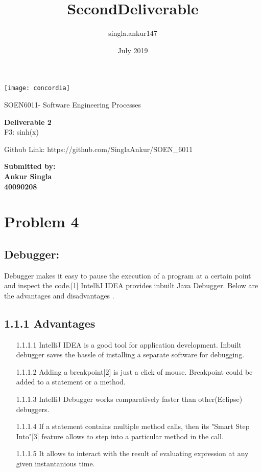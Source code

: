 \documentclass[10pt]{article}
\title{SecondDeliverable}
\author{singla.ankur147 }
\date{July 2019}
\begin{document}
\texttt{[image: concordia]}

\Large SOEN6011- Software Engineering Processes\\
\begin{center}
\textbf{Deliverable 2}\\
F3: sinh(x)
\end{center}

Github Link: https://github.com/SinglaAnkur/SOEN\_6011
\vspace{90mm}\\
\begin{large}
\textbf{Submitted by:}\\
\textbf{Ankur Singla}\\
\textbf{40090208}\\
\end{large}
\newpage
\tableofcontents
\newpage
\section{Problem 4}
\subsection{Debugger:}
Debugger makes it easy to pause the execution of a program at a certain point and inspect the code.[1] IntelliJ IDEA provides inbuilt Java Debugger. Below are the advantages and disadvantages .\\
\subsection*{\large 1.1.1 Advantages}
\begin{description}
\begin{itemize}
\item [1.1.1.1] IntelliJ IDEA is a good tool for application development. Inbuilt debugger saves the hassle of installing a separate software for debugging.
\item [1.1.1.2]Adding a breakpoint[2] is just a click of mouse. Breakpoint could be added to a statement or a method.
\item [1.1.1.3]IntelliJ Debugger works comparatively faster than other(Eclipse) debuggers.
\item [1.1.1.4]If a statement contains multiple method calls, then its "Smart Step Into"[3] feature allows to step into a particular method in the call.
\item [1.1.1.5]It allows to interact with the result of evaluating expression at any given instantanious time.
\end{itemize}
\end{description}
\end{document}
